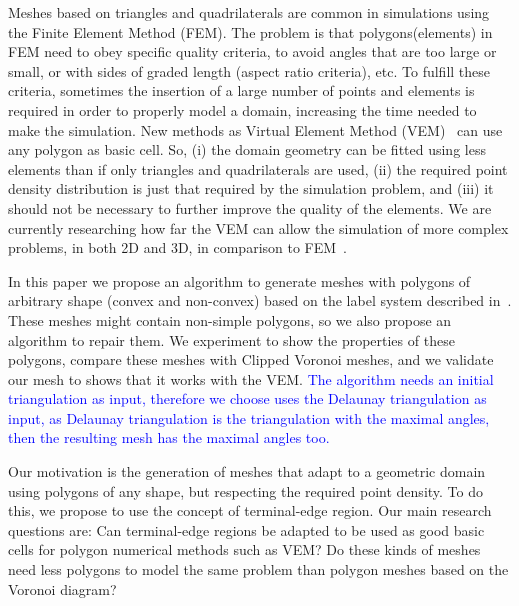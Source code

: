 Meshes based on triangles and quadrilaterals are common in simulations using the Finite Element Method (FEM). The problem is that polygons(elements) in FEM need to obey specific quality criteria, to avoid angles that are too large or small, or with sides of graded  length (aspect ratio criteria), etc. To fulfill these criteria, sometimes the insertion of a large number of points and elements is required in order to properly model a domain, increasing the time needed to make the simulation. New methods as Virtual Element Method (VEM)~\cite{Basisprinciples,Brezzi2015} can use any polygon as basic cell. So, (i) the domain geometry can be fitted using  less elements than if only triangles and quadrilaterals are used, (ii) the required point density distribution is just that required by the simulation problem, and (iii) it should not be necessary to further improve the quality of the elements. We are currently researching how far the VEM can allow the simulation of more complex problems, in both 2D and 3D, in comparison to FEM~\cite{Wriggers2019}.








In this paper we propose an algorithm to generate meshes with polygons of arbitrary shape (convex and non-convex) based on the label system described in~\cite{Ojeda2018ANA}. These meshes might contain non-simple polygons, so we also propose an algorithm to repair them. We  experiment to show the properties of these polygons, compare these meshes with Clipped Voronoi meshes, and we validate our mesh to shows that it works with the VEM. \textcolor{blue}{The algorithm needs an initial triangulation as input, therefore we choose uses the Delaunay triangulation as input, as Delaunay triangulation is the triangulation with the maximal angles, then the resulting mesh has the maximal angles too.}

Our motivation is the generation of meshes that adapt to a geometric domain using  polygons of any shape, but respecting the required point density. To do this, we propose to use the concept of terminal-edge region. Our main research questions are: Can terminal-edge regions be adapted to be used as good basic cells for polygon numerical methods such as VEM? Do these kinds of meshes need less polygons to model the same problem than polygon meshes based on the Voronoi diagram? 

